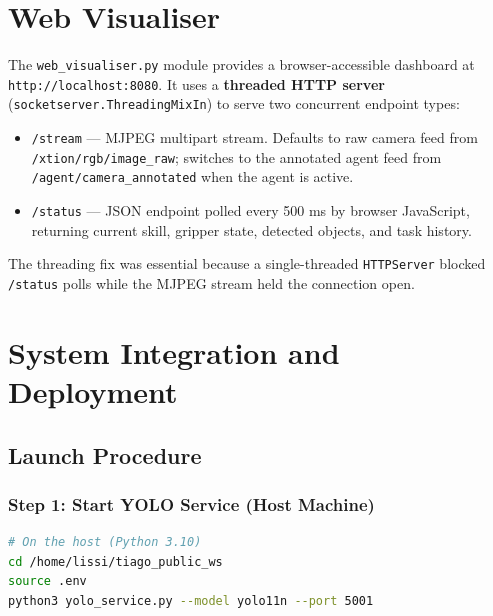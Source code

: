 \documentclass[12pt,a4paper]{report}
\begin{document}
\chapter{Web Visualiser}

The \texttt{web\_visualiser.py} module provides a browser-accessible dashboard at
\texttt{http://localhost:8080}.  It uses a \textbf{threaded HTTP server}
(\texttt{socketserver.ThreadingMixIn}) to serve two concurrent endpoint types:

\begin{itemize}[noitemsep]
  \item \texttt{/stream} — MJPEG multipart stream.  Defaults to raw camera feed from
        \texttt{/xtion/rgb/image\_raw}; switches to the annotated agent feed from
        \texttt{/agent/camera\_annotated} when the agent is active.
  \item \texttt{/status} — JSON endpoint polled every 500 ms by browser JavaScript,
        returning current skill, gripper state, detected objects, and task history.
\end{itemize}

The threading fix was essential because a single-threaded \texttt{HTTPServer} blocked
\texttt{/status} polls while the MJPEG stream held the connection open.

\chapter{System Integration and Deployment}

\section{Launch Procedure}

\subsection{Step 1: Start YOLO Service (Host Machine)}

\begin{lstlisting}[language=bash]
# On the host (Python 3.10)
cd /home/lissi/tiago_public_ws
source .env
python3 yolo_service.py --model yolo11n --port 5001
\end{lstlisting}
\end{document}
